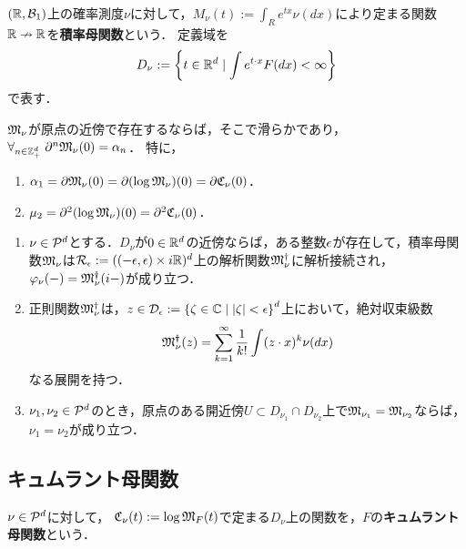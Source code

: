 \documentclass[uplatex,dvipdfmx]{jsreport}
\begin{document}
\begin{definition}
    $(\R,\B_1)$上の確率測度$\nu$に対して，$M_\nu(t):=\int_R e^{tx}\nu(dx)$により定まる関数$\R\nrightarrow\R$を\textbf{積率母関数}という．
    定義域を
    \[D_\nu:=\Brace{t\in\R^d\mid\int e^{t\cdot x}F(dx)<\infty}\]
    で表す．
\end{definition}

\begin{lemma}
    $\fM_\nu$が原点の近傍で存在するならば，そこで滑らかであり，$\forall_{n\in\Z^d_+}\;\partial^n\fM_\nu(0)=\al_n$．
    特に，
    \begin{enumerate}
        \item $\al_1=\partial\fM_\nu(0)=\partial(\log\fM_\nu)(0)=\partial\fC_\nu(0)$．
        \item $\mu_2=\partial^2(\log\fM_\nu)(0)=\partial^2\fC_\nu(0)$．
    \end{enumerate}
\end{lemma}

\begin{theorem}[一意性定理]\mbox{}
    \begin{enumerate}
        \item $\nu\in\P^d$とする．$D_\nu$が$0\in\R^d$の近傍ならば，ある整数$\ep$が存在して，積率母関数$\fM_\nu$は$\cR_\ep:=((-\ep,\ep)\times i\R)^d$上の解析関数$\fM^\dagger_\nu$に解析接続され，$\varphi_\nu(-)=\fM^\dagger_\nu(i-)$が成り立つ．
        \item 正則関数$\fM^\dagger_\nu$は，$z\in\D_\ep:=\Brace{\zeta\in\C\mid\abs{\zeta}<\ep}^d$上において，絶対収束級数
        \[\fM^\dagger_\nu(z)=\sum^\infty_{k=1}\frac{1}{k!}\int(z\cdot x)^k\nu(dx)\]
        なる展開を持つ．
        \item $\nu_1,\nu_2\in\P^d$のとき，原点のある開近傍$U\subset D_{\nu_1}\cap D_{\nu_2}$上で$\fM_{\nu_1}=\fM_{\nu_2}$ならば，$\nu_1=\nu_2$が成り立つ．
    \end{enumerate}
\end{theorem}

\subsection{キュムラント母関数}

\begin{definition}
    $\nu\in\P^d$に対して，
    $\fC_\nu(t):=\log\fM_F(t)$で定まる$D_\nu$上の関数を，$F$の\textbf{キュムラント母関数}という．
\end{definition}
\end{document}
